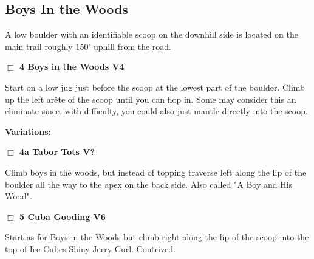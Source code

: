	\raggedcolumns
	\begin{multicols}{2}


\needspace{1.5cm}
\subsection*{Boys In the Woods}\label{bf:Boys In the Woods}
A low boulder with an identifiable scoop on the downhill side is located on the main trail roughly 150' uphill from the road.\\
	


\needspace{1.5cm}
\label{rt:Boys in the Woods}
\colorbox{RoyalBlue!20}{
\parbox{0.95\linewidth}{
\hspace{-1ex}\textbf{$\Box$
4 Boys in the Woods V4  
}}}
\begin{adjustwidth}{1.3em}{}			
Start on a low jug just before the scoop at the lowest part of the boulder. Climb up the left arête of the scoop until you can flop in. Some may consider this an eliminate since, with difficulty, you could also just mantle directly into the scoop.
\end{adjustwidth}


\begin{adjustwidth}{0.5cm}{}				
\needspace{3cm}
\textbf{Variations:} \newline

\needspace{1.5cm}
\label{vr:Tabor Tots}
\colorbox{black!20}{
\parbox{0.95\linewidth}{
\hspace{-1ex}\textbf{$\Box$
4a Tabor Tots V?  
}}}
\begin{adjustwidth}{1.3em}{}			
Climb boys in the woods, but instead of topping traverse left along the lip of the boulder all the way to the apex on the back side. Also called "A Boy and His Wood".
\end{adjustwidth}



\end{adjustwidth}


\needspace{1.5cm}
\label{rt:Cuba Gooding}
\colorbox{RoyalBlue!20}{
\parbox{0.95\linewidth}{
\hspace{-1ex}\textbf{$\Box$
5 Cuba Gooding V6  
}}}
\begin{adjustwidth}{1.3em}{}			
Start as for Boys in the Woods but climb right along the lip of the scoop into the top of Ice Cubes Shiny Jerry Curl. Contrived.
\end{adjustwidth}



\end{multicols}
